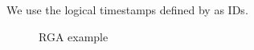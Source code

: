 We use the logical timestamps defined by \citet{Lamport:1978jq} as IDs.










\begin{figure}
\centering

\caption{RGA example}\label{fig.two-lists}
\end{figure}
